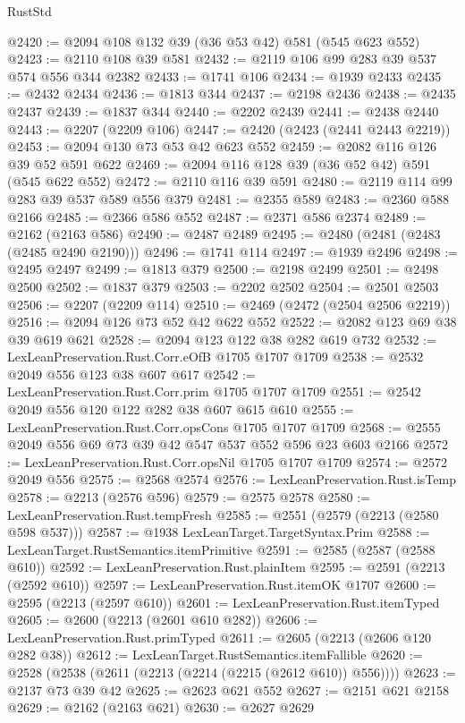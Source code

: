 \begin{lexlean}{RustStd}
\begin{coremodule}
@2420 := @2094 @108 @132 @39 (@36 @53 @42) @581 (@545 @623 @552)
@2423 := @2110 @108 @39 @581
@2432 := @2119 @106 @99 @283 @39 @537 @574 @556 @344 @2382
@2433 := @1741 @106
@2434 := @1939 @2433
@2435 := @2432 @2434
@2436 := @1813 @344
@2437 := @2198 @2436
@2438 := @2435 @2437
@2439 := @1837 @344
@2440 := @2202 @2439
@2441 := @2438 @2440
@2443 := @2207 (@2209 @106)
@2447 := @2420 (@2423 (@2441 @2443 @2219))
@2453 := @2094 @130 @73 @53 @42 @623 @552
@2459 := @2082 @116 @126 @39 @52 @591 @622
@2469 := @2094 @116 @128 @39 (@36 @52 @42) @591 (@545 @622 @552)
@2472 := @2110 @116 @39 @591
@2480 := @2119 @114 @99 @283 @39 @537 @589 @556 @379
@2481 := @2355 @589
@2483 := @2360 @588 @2166
@2485 := @2366 @586 @552
@2487 := @2371 @586 @2374
@2489 := @2162 (@2163 @586)
@2490 := @2487 @2489
@2495 := @2480 (@2481 (@2483 (@2485 @2490 @2190)))
@2496 := @1741 @114
@2497 := @1939 @2496
@2498 := @2495 @2497
@2499 := @1813 @379
@2500 := @2198 @2499
@2501 := @2498 @2500
@2502 := @1837 @379
@2503 := @2202 @2502
@2504 := @2501 @2503
@2506 := @2207 (@2209 @114)
@2510 := @2469 (@2472 (@2504 @2506 @2219))
@2516 := @2094 @126 @73 @52 @42 @622 @552
@2522 := @2082 @123 @69 @38 @39 @619 @621
@2528 := @2094 @123 @122 @38 @282 @619 @732
@2532 := LexLeanPreservation.Rust.Corr.eOfB @1705 @1707 @1709
@2538 := @2532 @2049 @556 @123 @38 @607 @617
@2542 := LexLeanPreservation.Rust.Corr.prim @1705 @1707 @1709
@2551 := @2542 @2049 @556 @120 @122 @282 @38 @607 @615 @610
@2555 := LexLeanPreservation.Rust.Corr.opsCons @1705 @1707 @1709
@2568 := @2555 @2049 @556 @69 @73 @39 @42 @547 @537 @552 @596 @23 @603 @2166
@2572 := LexLeanPreservation.Rust.Corr.opsNil @1705 @1707 @1709
@2574 := @2572 @2049 @556
@2575 := @2568 @2574
@2576 := LexLeanPreservation.Rust.isTemp
@2578 := @2213 (@2576 @596)
@2579 := @2575 @2578
@2580 := LexLeanPreservation.Rust.tempFresh
@2585 := @2551 (@2579 (@2213 (@2580 @598 @537)))
@2587 := @1938 LexLeanTarget.TargetSyntax.Prim
@2588 := LexLeanTarget.RustSemantics.itemPrimitive
@2591 := @2585 (@2587 (@2588 @610))
@2592 := LexLeanPreservation.Rust.plainItem
@2595 := @2591 (@2213 (@2592 @610))
@2597 := LexLeanPreservation.Rust.itemOK @1707
@2600 := @2595 (@2213 (@2597 @610))
@2601 := LexLeanPreservation.Rust.itemTyped
@2605 := @2600 (@2213 (@2601 @610 @282))
@2606 := LexLeanPreservation.Rust.primTyped
@2611 := @2605 (@2213 (@2606 @120 @282 @38))
@2612 := LexLeanTarget.RustSemantics.itemFallible
@2620 := @2528 (@2538 (@2611 (@2213 (@2214 (@2215 (@2612 @610)) @556))))
@2623 := @2137 @73 @39 @42
@2625 := @2623 @621 @552
@2627 := @2151 @621 @2158
@2629 := @2162 (@2163 @621)
@2630 := @2627 @2629

\end{coremodule}
\end{lexlean}
